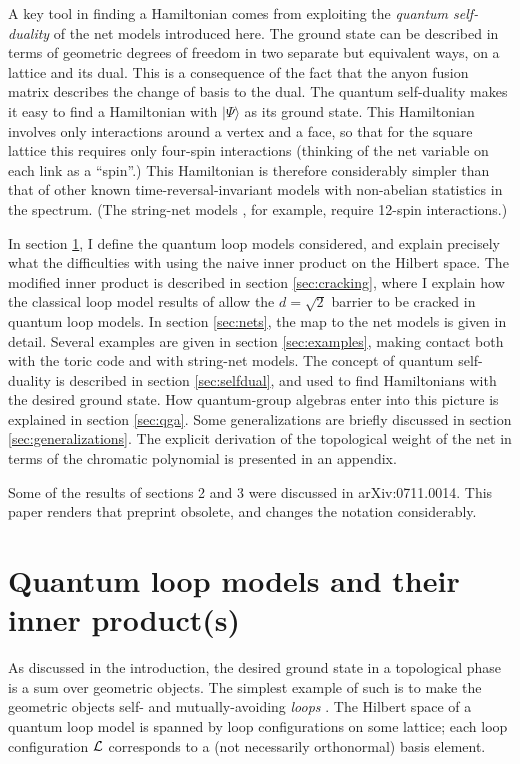 \documentclass[11pt]{article}
\begin{document}
A key tool in finding a Hamiltonian comes from exploiting the {\em
quantum self-duality} of the net models introduced here.  The ground
state can be described in terms of geometric degrees of freedom in two
separate but equivalent ways, on a lattice and its dual.  This is a
consequence of the fact that the anyon fusion matrix describes the
change of basis to the dual.  The quantum self-duality makes it easy
to find a Hamiltonian with $|\Psi\rangle$ as its ground state.  This
Hamiltonian involves only interactions around a vertex and a face, so
that for the square lattice this requires only four-spin interactions
(thinking of the net variable on each link as a ``spin''.) This
Hamiltonian is therefore considerably simpler than that of other known
time-reversal-invariant models with non-abelian statistics in the
spectrum.  (The string-net models \cite{LevinWen}, for example,
require 12-spin interactions.)




In section \ref{sec:naive}, I define the quantum loop models
considered, and explain precisely what the difficulties with using the
naive inner product on the Hilbert space.  The modified inner product
is described in section \ref{sec:cracking}, where I explain how the
classical loop model results of \cite{FJ} allow the $d=\sqrt{2}$
barrier to be cracked in quantum loop models.  In section
\ref{sec:nets}, the map to the net models is given in detail.  Several
examples are given in section \ref{sec:examples}, making contact both
with the toric code and with string-net models. The concept of quantum
self-duality is described in section \ref{sec:selfdual}, and used
to find Hamiltonians with the desired ground state. How quantum-group
algebras enter into this picture is explained in section \ref{sec:qga}. Some
generalizations are briefly discussed in section \ref{sec:generalizations}.
The explicit derivation of the topological weight of the net in terms
of the chromatic polynomial is presented in an appendix.


Some of the results of sections 2 and 3 were discussed in
arXiv:0711.0014. This paper renders that preprint obsolete, and changes the
notation considerably.

\section{Quantum loop models and their inner product(s)}
\label{sec:naive}

As discussed in the introduction, the desired ground
state in a topological phase is a sum over geometric objects. The
simplest example of such is to make the geometric objects self- and
mutually-avoiding {\em loops} \cite{Freedman01}. 
The Hilbert space of a quantum loop model is spanned by loop
configurations on some lattice; each loop configuration ${\cal L}$
corresponds to a (not necessarily orthonormal) basis element.
\end{document}

